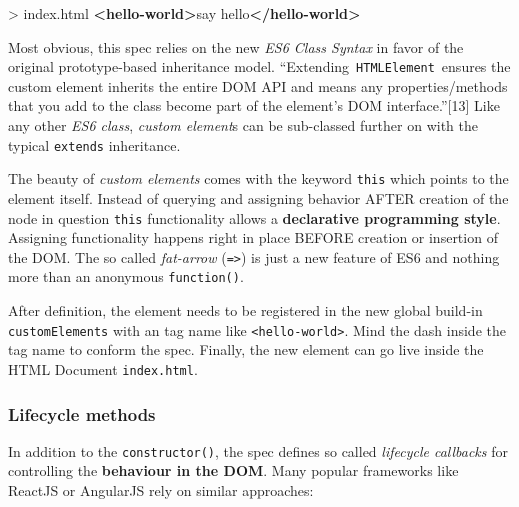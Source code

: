 \documentclass[]{assets/latex/ieee}
\newenvironment{Shaded}{}{}
\newcommand{\KeywordTok}[1]{\textcolor[rgb]{0.00,0.44,0.13}{\textbf{{#1}}}}
\newcommand{\NormalTok}[1]{{#1}}
\begin{document}
\begin{Shaded}
\begin{Highlighting}[]
\NormalTok{> index.html}
\KeywordTok{<hello-world>}\NormalTok{say hello}\KeywordTok{</hello-world>}
\end{Highlighting}
\end{Shaded}

Most obvious, this spec relies on the new \emph{ES6 Class Syntax} in
favor of the original prototype-based inheritance model.
``Extending~\texttt{HTMLElement}~ensures the custom element inherits the
entire DOM API and means any properties/methods that you add to the
class become part of the element's DOM interface.''{[}13{]} Like any
other \emph{ES6 class}, \emph{custom element}s can be sub-classed
further on with the typical \texttt{extends} inheritance.

The beauty of \emph{custom elements} comes with the keyword
\texttt{this} which points to the element itself. Instead of querying
and assigning behavior AFTER creation of the node in question
\texttt{this} functionality allows a \textbf{declarative programming
style}. Assigning functionality happens right in place BEFORE creation
or insertion of the DOM. The so called \emph{fat-arrow}
(\texttt{=\textgreater{}}) is just a new feature of ES6 and nothing more
than an anonymous \texttt{function()}.

After definition, the element needs to be registered in the new global
build-in \texttt{customElements} with an tag name like
\texttt{\textless{}hello-world\textgreater{}}. Mind the dash inside the
tag name to conform the spec. Finally, the new element can go live
inside the HTML Document \texttt{index.html}.

\subsubsection{Lifecycle methods}\label{lifecycle-methods}

In addition to the \texttt{constructor()}, the spec defines so called
\emph{lifecycle callbacks} for controlling the \textbf{behaviour in the
DOM}. Many popular frameworks like ReactJS or AngularJS rely on similar
approaches:
\end{document}
